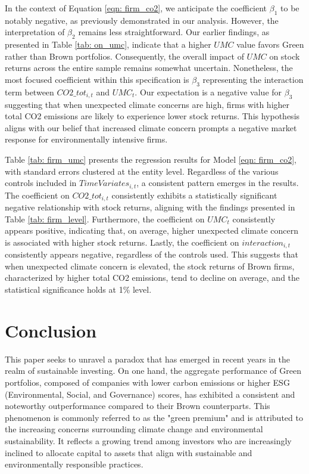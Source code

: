 \documentclass[12pt]{article}
\begin{document}
In the context of Equation \ref{eqn: firm_co2}, we anticipate the coefficient $\beta_1$ to be notably negative, as previously demonstrated in our analysis. However, the interpretation of $\beta_2$ remains less straightforward. Our earlier findings, as presented in Table \ref{tab: on_umc}, indicate that a higher $UMC$ value favors Green rather than Brown portfolios. Consequently, the overall impact of $UMC$ on stock returns across the entire sample remains somewhat uncertain. Nonetheless, the most focused coefficient within this specification is $\beta_3$ representing the interaction term between $CO2\_tot_{i,t}$ and $UMC_t$. Our expectation is a negative value for $\beta_3$ suggesting that when unexpected climate concerns are high, firms with higher total CO2 emissions are likely to experience lower stock returns. This hypothesis aligns with our belief that increased climate concern prompts a negative market response for environmentally intensive firms.

Table \ref{tab: firm_umc} presents the regression results for Model \ref{eqn: firm_co2}, with standard errors clustered at the entity level. Regardless of the various controls included in $TimeVariates_{i,t}$, a consistent pattern emerges in the results. The coefficient on $CO2\_tot_{i,t}$ consistently exhibits a statistically significant negative relationship with stock returns, aligning with the findings presented in Table \ref{tab: firm_level}. Furthermore, the coefficient on $UMC_t$ consistently appears positive, indicating that, on average, higher unexpected climate concern is associated with higher stock returns. Lastly, the coefficient on $interaction_{i,t}$ consistently appears negative, regardless of the controls used. This suggests that when unexpected climate concern is elevated, the stock returns of Brown firms, characterized by higher total CO2 emissions, tend to decline on average, and the statistical significance holds at 1\% level.

\clearpage
\section{Conclusion} \label{sec:conclusion}

This paper seeks to unravel a paradox that has emerged in recent years in the realm of sustainable investing. On one hand, the aggregate performance of Green portfolios, composed of companies with lower carbon emissions or higher ESG (Environmental, Social, and Governance) scores, has exhibited a consistent and noteworthy outperformance compared to their Brown counterparts. This phenomenon is commonly referred to as the "green premium" and is attributed to the increasing concerns surrounding climate change and environmental sustainability. It reflects a growing trend among investors who are increasingly inclined to allocate capital to assets that align with sustainable and environmentally responsible practices.
\end{document}
